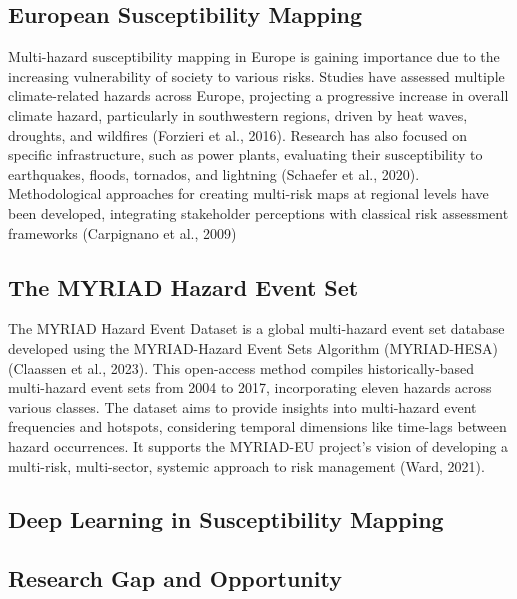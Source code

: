 \subsection{European Susceptibility Mapping}
Multi-hazard susceptibility mapping in Europe is gaining importance due to the increasing vulnerability of society to various risks. Studies have assessed multiple climate-related hazards across Europe, projecting a progressive increase in overall climate hazard, particularly in southwestern regions, driven by heat waves, droughts, and wildfires (Forzieri et al., 2016). Research has also focused on specific infrastructure, such as power plants, evaluating their susceptibility to earthquakes, floods, tornados, and lightning (Schaefer et al., 2020). Methodological approaches for creating multi-risk maps at regional levels have been developed, integrating stakeholder perceptions with classical risk assessment frameworks (Carpignano et al., 2009)


\subsection{The MYRIAD Hazard Event Set}
The MYRIAD Hazard Event Dataset is a global multi-hazard event set database developed using the MYRIAD-Hazard Event Sets Algorithm (MYRIAD-HESA) (Claassen et al., 2023). This open-access method compiles historically-based multi-hazard event sets from 2004 to 2017, incorporating eleven hazards across various classes. The dataset aims to provide insights into multi-hazard event frequencies and hotspots, considering temporal dimensions like time-lags between hazard occurrences. It supports the MYRIAD-EU project's vision of developing a multi-risk, multi-sector, systemic approach to risk management (Ward, 2021).
\subsection{Deep Learning in Susceptibility Mapping}

\subsection{Research Gap and Opportunity}
